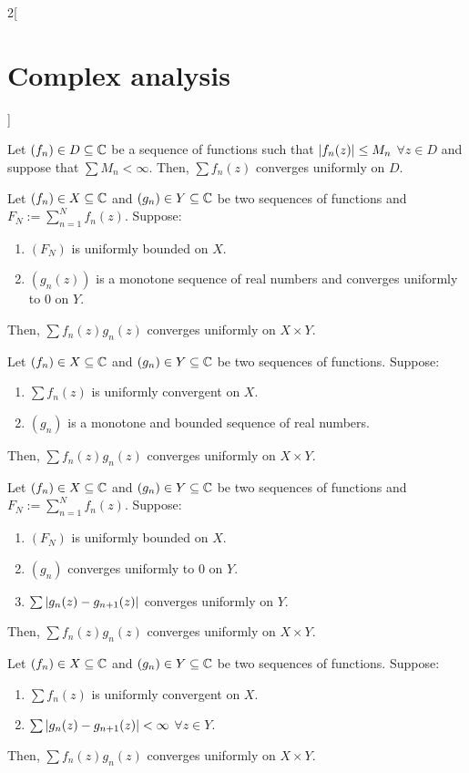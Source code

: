 \documentclass[../../../main_math.tex]{subfiles}
\begin{document}
\begin{multicols}{2}[\section{Complex analysis}]
\begin{theorem}
    Let $(f_n)\in D\subseteq\mathbb{C}$ be a sequence of functions such that $\abs{f_n(z)}\leq M_n$ $\forall z\in D$ and suppose that $\sum M_n<\infty$. Then, $\sum f_n(z)$ converges uniformly on $D$.
  \end{theorem}
  \begin{theorem}
    Let $(f_n)\in X\subseteq \mathbb{C}$ and $(g_n)\in Y\subseteq \mathbb{C}$ be two sequences of functions and $F_N:=\sum_{n=1}^Nf_n(z)$. Suppose:
    \begin{enumerate}
      \item $(F_N)$ is uniformly bounded on $X$.
      \item $(g_n(z))$ is a monotone sequence of real numbers and converges uniformly to 0 on $Y$.
    \end{enumerate}
    Then, $\sum f_n(z)g_n(z)$ converges uniformly on $X\times Y$.
  \end{theorem}
  \begin{theorem}
    Let $(f_n)\in X\subseteq \mathbb{C}$ and $(g_n)\in Y\subseteq \mathbb{C}$ be two sequences of functions. Suppose:
    \begin{enumerate}
      \item $\sum f_n(z)$ is uniformly convergent on $X$.
      \item $(g_n)$ is a monotone and bounded sequence of real numbers.
    \end{enumerate}
    Then, $\sum f_n(z)g_n(z)$ converges uniformly on $X\times Y$.
  \end{theorem}
  \begin{theorem}
    Let $(f_n)\in X\subseteq \mathbb{C}$ and $(g_n)\in Y\subseteq \mathbb{C}$ be two sequences of functions and $F_N:=\sum_{n=1}^Nf_n(z)$. Suppose:
    \begin{enumerate}
      \item $(F_N)$ is uniformly bounded on $X$.
      \item $(g_n)$ converges uniformly to 0 on $Y$.
      \item $\sum\abs{g_n(z)-g_{n+1}(z)}$ converges uniformly on $Y$.
    \end{enumerate}
    Then, $\sum f_n(z)g_n(z)$ converges uniformly on $X\times Y$.
  \end{theorem}
  \begin{theorem}
    Let $(f_n)\in X\subseteq \mathbb{C}$ and $(g_n)\in Y\subseteq \mathbb{C}$ be two sequences of functions. Suppose:
    \begin{enumerate}
      \item $\sum f_n(z)$ is uniformly convergent on $X$.
      \item $\sum\abs{g_n(z)-g_{n+1}(z)}<\infty$ $\forall z\in Y$.
    \end{enumerate}
    Then, $\sum f_n(z)g_n(z)$ converges uniformly on $X\times Y$.
  \end{theorem}

\end{multicols}
\end{document}
